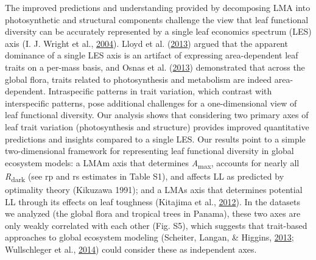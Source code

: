 \documentclass[12pt,]{article}
\theoremstyle{definition}
\theoremstyle{definition}
\theoremstyle{definition}
\theoremstyle{remark}
\begin{document}
The improved predictions and understanding provided by decomposing LMA
into photosynthetic and structural components challenge the view that
leaf functional diversity can be accurately represented by a single leaf
economics spectrum (LES) axis (I. J. Wright et al.,
\protect\hyperlink{ref-Wright2004a}{2004}). Lloyd et al.
(\protect\hyperlink{ref-Lloyd2013}{2013}) argued that the apparent
dominance of a single LES axis is an artifact of expressing
area-dependent leaf traits on a per-mass basis, and Osnas et al.
(\protect\hyperlink{ref-Osnas2013}{2013}) demonstrated that across the
global flora, traits related to photosynthesis and metabolism are indeed
area-dependent. Intraspecific patterns in trait variation, which
contrast with interspecific patterns, pose additional challenges for a
one-dimensional view of leaf functional diversity. Our analysis shows
that considering two primary axes of leaf trait variation
(photosynthesis and structure) provides improved quantitative
predictions and insights compared to a single LES. Our results point to
a simple two-dimensional framework for representing leaf functional
diversity in global ecosystem models: a LMAm axis that determines
\emph{A}\textsubscript{max}, accounts for nearly all
\emph{R}\textsubscript{dark} (see rp and rs estimates in Table S1), and
affects LL as predicted by optimality theory (Kikuzawa 1991); and a LMAs
axis that determines potential LL through its effects on leaf toughness
(Kitajima et al., \protect\hyperlink{ref-Kitajima2012}{2012}). In the
datasets we analyzed (the global flora and tropical trees in Panama),
these two axes are only weakly correlated with each other (Fig. S5),
which suggests that trait-based approaches to global ecosystem modeling
(Scheiter, Langan, \& Higgins,
\protect\hyperlink{ref-Scheiter2013}{2013}; Wullschleger et al.,
\protect\hyperlink{ref-Wullschleger2014}{2014}) could consider these as
independent axes.
\end{document}
